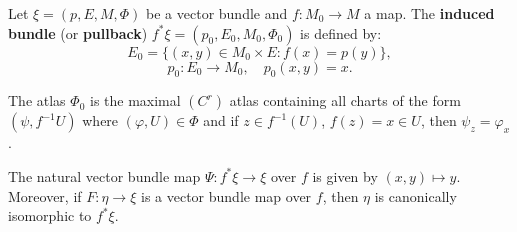 Let $\xi = (p, E, M, \Phi)$ be a vector bundle and $f: M_0 \to M$ a map. The \textbf{induced bundle} (or \textbf{pullback}) $f^*\xi = (p_0, E_0, M_0, \Phi_0)$ is defined by:
$$E_0 = \{(x, y) \in M_0 \times E : f(x) = p(y)\},$$
$$p_0: E_0 \to M_0, \quad p_0(x, y) = x.$$

The atlas $\Phi_0$ is the maximal $(C^r)$ atlas containing all charts of the form $(\psi, f^{-1}U)$ where $(\varphi, U) \in \Phi$ and if $z \in f^{-1}(U)$, $f(z) = x \in U$, then $\psi_z = \varphi_x$.

The natural vector bundle map $\Psi: f^*\xi \to \xi$ over $f$ is given by $(x, y) \mapsto y$. Moreover, if $F: \eta \to \xi$ is a vector bundle map over $f$, then $\eta$ is canonically isomorphic to $f^*\xi$.
